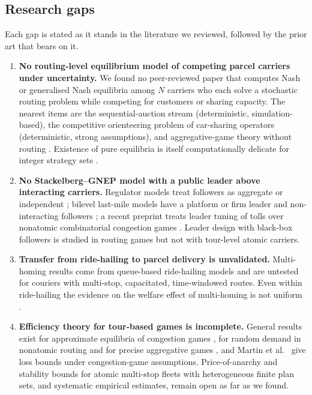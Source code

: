 \documentclass[preprint,12pt]{elsarticle}
\newcommand{\gap}[1]{\textbf{#1}}
\begin{document}
\subsection{Research gaps}\label{sec:gaps}

Each gap is stated as it stands in the literature we reviewed, followed by the prior art that bears on it.

\begin{enumerate}[leftmargin=*,label=\gap{G\arabic*}.,itemsep=4pt]
\item \gap{No routing-level equilibrium model of competing parcel carriers under uncertainty.} We found no peer-reviewed paper that computes Nash or generalised Nash equilibria among $N$ carriers who each solve a stochastic routing problem while competing for customers or sharing capacity. The nearest items are the sequential-auction stream \cite{Figliozzi2007} (deterministic, simulation-based), the competitive orienteering problem of car-sharing operators \cite{Martin2021} (deterministic, strong assumptions), and aggregative-game theory without routing \cite{Liu2023}. Existence of pure equilibria is itself computationally delicate for integer strategy sets \cite{Apt2022,Carvalho2022}.
\item \gap{No Stackelberg--GNEP model with a public leader above interacting carriers.} Regulator models treat followers as aggregate or independent \cite{Catalano2014,XuSun2024}; bilevel last-mile models have a platform or firm leader and non-interacting followers \cite{Cerulli2024,Fernandez2025}; a recent preprint treats leader tuning of tolls over nonatomic combinatorial congestion games \cite{Masiha2026}. Leader design with black-box followers is studied in routing games \cite{Bhaskar2019} but not with tour-level atomic carriers.
\item \gap{Transfer from ride-hailing to parcel delivery is unvalidated.} Multi-homing results come from queue-based ride-hailing models and are untested for couriers with multi-stop, capacitated, time-windowed routes. Even within ride-hailing the evidence on the welfare effect of multi-homing is not uniform \cite{Bernstein2021,Gao2025tre}.
\item \gap{Efficiency theory for tour-based games is incomplete.} General results exist for approximate equilibria of congestion games \cite{Christodoulou2011}, for random demand in nonatomic routing \cite{Correa2019} and for precise aggregative games \cite{Liu2023}, and Martin et al.\ \cite{Martin2021} give loss bounds under congestion-game assumptions. Price-of-anarchy and stability bounds for atomic multi-stop fleets with heterogeneous finite plan sets, and systematic empirical estimates, remain open as far as we found.

\end{enumerate}
\end{document}
